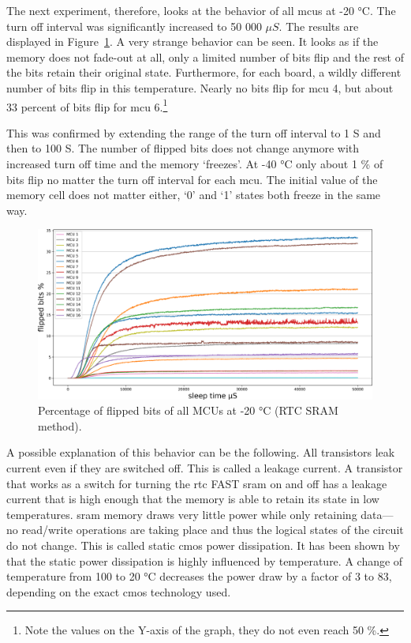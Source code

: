 The next experiment, therefore, looks at the behavior of all \glspl{mcu} at -20 °C. The turn off interval was significantly increased to 50 000 $\mu{}S$. The results are displayed in Figure~\ref{fig:all_minus_20_rtc}. A very strange behavior can be seen. It looks as if the memory does not fade-out at all, only a limited number of bits flip and the rest of the bits retain their original state. Furthermore, for each board, a wildly different number of bits flip in this temperature. Nearly no bits flip for \gls{mcu} 4, but about 33 percent of bits flip for \gls{mcu} 6.\footnote{Note the values on the Y-axis of the graph, they do not even reach 50 \%.}

This was confirmed by extending the range of the turn off interval to 1 S and then to 100 S. The number of flipped bits does not change anymore with increased turn off time and the memory `freezes'. At -40 °C only about 1 \% of bits flip no matter the turn off interval for each \gls{mcu}. The initial value of the memory cell does not matter either, `0' and `1' states both freeze in the same way. 

\begin{figure}[ht!]
    \centering
    \captionsetup{justification=centering,margin=0.5cm}
    \includegraphics[width=\textwidth]{images/all_minus_20_rtc.png}
    \caption{Percentage of flipped bits of all MCUs at -20 °C (RTC SRAM method).}
    \label{fig:all_minus_20_rtc}
\end{figure}

A possible explanation of this behavior can be the following. All transistors leak current even if they are switched off. This is called a leakage current. A transistor that works as a switch for turning the \gls{rtc} FAST \gls{sram} on and off has a leakage current that is high enough that the memory is able to retain its state in low temperatures. \gls{sram} memory draws very little power while only retaining data---no read/write operations are taking place and thus the logical states of the circuit do not change. This is called static \gls{cmos} power dissipation. It has been shown by \cite{Kocanda2015} that the static power dissipation is highly influenced by temperature. A change of temperature from 100 to 20 °C decreases the power draw by a factor of 3 to 83, depending on the exact \gls{cmos} technology used.

